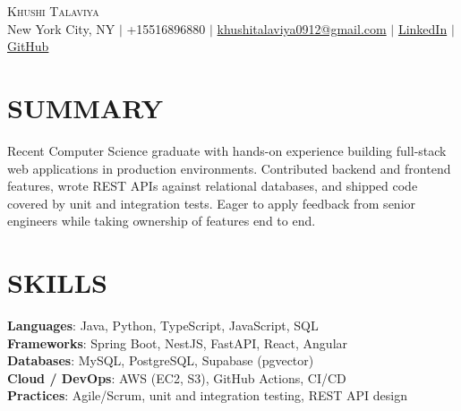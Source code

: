 \documentclass[letterpaper,11pt]{article}
\begin{document}
\begin{center}
    {\Huge \scshape Khushi Talaviya} \\ \vspace{2pt}
    \vspace{4pt}
    \small
    New York City, NY $|$
    \small
    +15516896880 $|$
    \href{mailto:khushitalaviya0912@gmail.com}{khushitalaviya0912@gmail.com} $|$
    \href{https://www.linkedin.com/in/khushitalaviya/}{LinkedIn} $|$
    \href{https://github.com/talaviyakhushi}{GitHub}
\end{center}

\section{SUMMARY}
\vspace{5pt}
\small{Recent Computer Science graduate with hands-on experience building full-stack web applications in production environments. Contributed backend and frontend features, wrote REST APIs against relational databases, and shipped code covered by unit and integration tests. Eager to apply feedback from senior engineers while taking ownership of features end to end.}

\vspace{2pt}
\section{SKILLS}
\vspace{5pt}
\begin{itemize}[leftmargin=0in, label={}]
\small{\item{
\textbf{Languages}{: Java, Python, TypeScript, JavaScript, SQL} \\
\textbf{Frameworks}{: Spring Boot, NestJS, FastAPI, React, Angular} \\
\textbf{Databases}{: MySQL, PostgreSQL, Supabase (pgvector)} \\
\textbf{Cloud / DevOps}{: AWS (EC2, S3), GitHub Actions, CI/CD} \\
\textbf{Practices}{: Agile/Scrum, unit and integration testing, REST API design}
}}
\end{itemize}
\vspace{-10pt}

\end{document}
